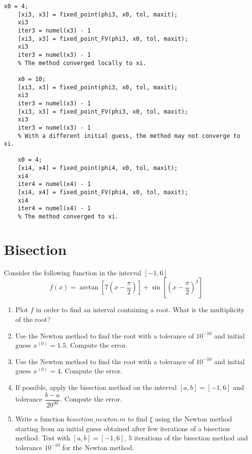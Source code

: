 \documentclass[12pt, a4paper]{report}
\begin{document}
\begin{lstlisting}[style=Matlab]
    x0 = 4;
    [xi3, x3] = fixed_point(phi3, x0, tol, maxit);
    xi3
    iter3 = numel(x3) - 1
    [xi3, x3] = fixed_point_FV(phi3, x0, tol, maxit);
    xi3
    iter3 = numel(x3) - 1
    % The method converged locally to xi.

    x0 = 10;
    [xi3, x3] = fixed_point(phi3, x0, tol, maxit);
    xi3
    iter3 = numel(x3) - 1
    [xi3, x3] = fixed_point_FV(phi3, x0, tol, maxit);
    xi3
    iter3 = numel(x3) - 1
    % With a different initial guess, the method may not converge to xi.
    
    x0 = 4;
    [xi4, x4] = fixed_point(phi4, x0, tol, maxit);
    xi4
    iter4 = numel(x4) - 1
    [xi4, x4] = fixed_point_FV(phi4, x0, tol, maxit);
    xi4
    iter4 = numel(x4) - 1
    % The method converged to xi.
        \end{lstlisting}  

    \newpage 

    \section{Bisection}
        Consider the following function in the interval $[-1, 6]$
        \[f (x) = \arctan\left[7\left(x-\dfrac{\pi}{2}\right)\right]+\sin\left[\left(x-\dfrac{\pi}{2}\right)^{3}\right]\]
        \begin{enumerate}
            \item Plot $f$ in order to find an interval containing a root. What is the multiplicity of the root?
            \item Use the Newton method to find the root with a tolerance of $10^{-10}$ and initial guess $x^{(0)}=1.5$. Compute the error.
            \item Use the Newton method to find the root with a tolerance of $10^{-10}$ and initial guess $x^{(0)}=4$. Compute the error.
            \item If possible, apply the bisection method on the interval $[a, b] = [-1, 6]$ and tolerance $\dfrac{b-a}{20^{30}}$. Compute the error.
            \item Write a function $bisection\_newton.m$ to find $\xi$ using the Newton method starting from an initial guess obtained after few iterations of a bisection method. 
                Test with $[a, b] = [-1, 6]$, $5$ iterations of the bisection method and tolerance $10^{-10}$ for the Newton method.
        \end{enumerate}
\end{document}

